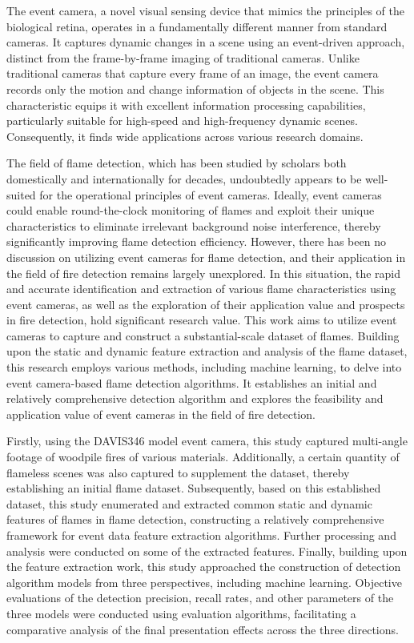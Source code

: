 \begin{abstract*}
  The event camera, a novel visual sensing device that mimics the principles of the biological
  retina, operates in a fundamentally different manner from standard cameras. It captures dynamic 
  changes in a scene using an event-driven approach, distinct from the frame-by-frame imaging of 
  traditional cameras. Unlike traditional cameras that capture every frame of an image, the event 
  camera records only the motion and change information of objects in the scene. This characteristic
  equips it with excellent information processing capabilities, particularly suitable for high-speed 
  and high-frequency dynamic scenes. Consequently, it finds wide applications across various research domains.
 
  The field of flame detection, which has been studied by scholars both domestically and internationally 
  for decades, undoubtedly appears to be well-suited for the operational principles of event cameras. 
  Ideally, event cameras could enable round-the-clock monitoring of flames and exploit their unique 
  characteristics to eliminate irrelevant background noise interference, thereby significantly improving flame 
  detection efficiency.  However, there has been no discussion on utilizing event cameras for flame detection, 
  and their application in the field of fire detection remains largely unexplored. In this situation, the rapid 
  and accurate identification and extraction of various flame characteristics using event cameras, as well as 
  the exploration of their application value and prospects in fire detection, hold significant research value.
  This work aims to utilize event cameras to capture and construct a substantial-scale dataset of flames. 
  Building upon the static and dynamic feature extraction and analysis of the flame dataset, this research 
  employs various methods, including machine learning, to delve into event camera-based flame detection algorithms.
  It establishes an initial and relatively comprehensive detection algorithm and explores the feasibility 
  and application value of event cameras in the field of fire detection.
 
  Firstly, using the DAVIS346 model event camera, this study captured multi-angle footage of woodpile fires 
  of various materials. Additionally, a certain quantity of flameless scenes was also captured to supplement 
  the dataset, thereby establishing an initial flame dataset. Subsequently, based on this established dataset, 
  this study enumerated and extracted common static and dynamic features of flames in flame detection, constructing 
  a relatively comprehensive framework for event data feature extraction algorithms. Further processing and analysis 
  were conducted on some of the extracted features. Finally, building upon the feature extraction work, this study 
  approached the construction of detection algorithm models from three perspectives, including machine learning.
  Objective evaluations of the detection precision, recall rates, and other parameters of the three models were 
  conducted using evaluation algorithms, facilitating a comparative analysis of the final presentation effects 
  across the three directions.
 

\end{abstract*}
